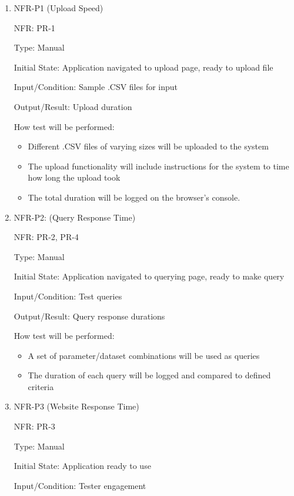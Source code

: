 \documentclass[12pt, titlepage]{article}
\begin{document}
\begin{enumerate}
  \item{NFR-P1 (Upload Speed)\\}
  
  NFR: PR-1

  Type: Manual

  Initial State: Application navigated to upload page, ready to upload file
  
  Input/Condition: Sample .CSV files for input
  
  Output/Result: Upload duration
  
  How test will be performed:
  \begin{itemize}
    \item Different .CSV files of varying sizes will be uploaded to the system
    \item The upload functionality will include instructions for the system to
    time how long the upload took
    \item The total duration will be logged on the browser's console.

  \end{itemize}
            
  \item{NFR-P2: (Query Response Time)\\}
  
  NFR: PR-2, PR-4

  Type: Manual

  Initial State: Application navigated to querying page, ready to make query
  
  Input/Condition: Test queries
  
  Output/Result: Query response durations

  How test will be performed:
  \begin{itemize}
    \item A set of parameter/dataset combinations will be used as queries
    \item The duration of each query will be logged and compared to defined
    criteria
  \end{itemize}

  \item{NFR-P3 (Website Response Time)\\}

  NFR: PR-3

  Type: Manual

  Initial State: Application ready to use

  Input/Condition: Tester engagement


\end{enumerate}
\end{document}
